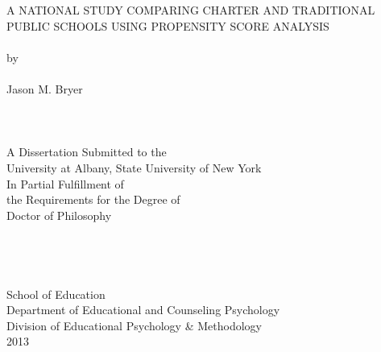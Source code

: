 \documentclass[letterpaper,12p,twoside]{article} %
\begin{document}
\begin{titlepage}
\vspace*{\fill}
\begin{center}
\uppercase{A National Study Comparing Charter and Traditional\\Public Schools Using Propensity Score Analysis}\\
\ \\
by
\ \\ \ \\
Jason M. Bryer\\
\ \\ \ \\ \ \\
A Dissertation Submitted to the\\
University at Albany, State University of New York\\
In Partial Fulfillment of\\
the Requirements for the Degree of\\
Doctor of Philosophy\\
\ \\ \ \\ \ \\ \ \\
School of Education\\
Department of Educational and Counseling Psychology\\
Division of Educational Psychology \& Methodology\\
2013
\end{center}
\vspace*{\fill}
\end{titlepage}
\setcounter{page}{2}
\newpage


\ \\
\cleardoublepage
\end{document}
